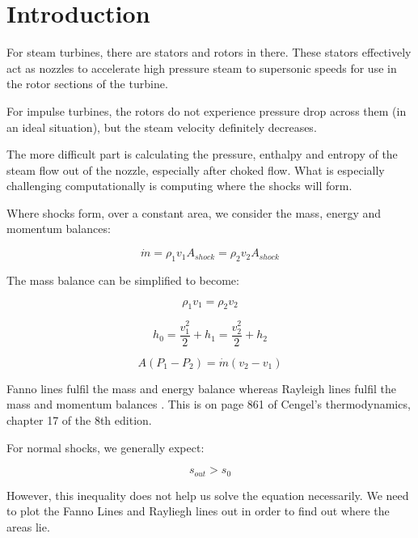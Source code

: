 \documentclass[masters]{ucbthesis}
\renewcommand{\_}{\kern-1.5pt\textunderscore\kern-1.5pt}
\begin{document}
\chapter{Introduction}

For steam turbines, there are stators and rotors in there. These 
stators effectively act as nozzles to accelerate high pressure steam 
to supersonic speeds for use in the rotor sections of the turbine. 

For impulse turbines, the rotors do not experience pressure drop across
them (in an ideal situation), but the steam velocity definitely decreases.

The more difficult part is calculating the pressure, enthalpy and entropy 
of the steam flow out of the nozzle, especially after choked flow. What 
is especially challenging computationally is computing where the shocks 
will form. 

Where shocks form, over a constant area, we
consider the mass, energy and momentum balances:

\begin{equation*}
	\dot{m} = \rho_1 v_1 A_{shock}= \rho_2 v_2 A_{shock}
\end{equation*}

The mass balance can be simplified to become:

\begin{equation*}
	 \rho_1 v_1 = \rho_2 v_2 
\end{equation*}

\begin{equation*}
	h_0 = \frac{v^2_1}{2} + h_1 = \frac{v^2_2}{2} + h_2
\end{equation*}

\begin{equation*}
	A(P_1 -P_2) = \dot{m} (v_2 - v_1)
\end{equation*}

Fanno lines fulfil the mass and energy balance 
\citep{cengel2002thermodynamics} whereas Rayleigh lines fulfil the 
mass and momentum balances \citep{cengel2002thermodynamics}. This is on page 
861 of Cengel's thermodynamics, chapter 17 of the 8th edition.

For normal shocks, we generally expect:

\begin{equation*}
	s_{out} > s_0
\end{equation*}

However, this inequality does not help us solve the equation necessarily.
We need to plot the Fanno Lines and Rayliegh lines out in order to find out 
where the areas lie.
\end{document}
